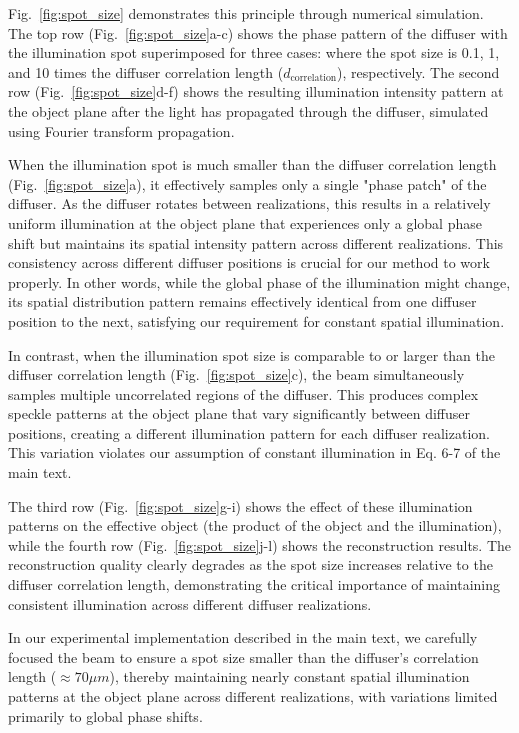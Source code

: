 \documentclass[pdflatex,sn-mathphys-num,Numbered]{sn-jnl}%
\theoremstyle{thmstyleone}%
\theoremstyle{thmstyletwo}%
\theoremstyle{thmstylethree}%
\begin{document}
Fig.~\ref{fig:spot_size} demonstrates this principle through numerical simulation. The top row (Fig.~\ref{fig:spot_size}a-c) shows the phase pattern of the diffuser with the illumination spot superimposed for three cases: where the spot size is 0.1, 1, and 10 times the diffuser correlation length ($d_{\text{correlation}}$), respectively. The second row (Fig.~\ref{fig:spot_size}d-f) shows the resulting illumination intensity pattern at the object plane after the light has propagated through the diffuser, simulated using Fourier transform propagation.

When the illumination spot is much smaller than the diffuser correlation length (Fig.~\ref{fig:spot_size}a), it effectively samples only a single "phase patch" of the diffuser. As the diffuser rotates between realizations, this results in a relatively uniform illumination at the object plane that experiences only a global phase shift but maintains its spatial intensity pattern across different realizations. This consistency across different diffuser positions is crucial for our method to work properly. In other words, while the global phase of the illumination might change, its spatial distribution pattern remains effectively identical from one diffuser position to the next, satisfying our requirement for constant spatial illumination.

In contrast, when the illumination spot size is comparable to or larger than the diffuser correlation length (Fig.~\ref{fig:spot_size}c), the beam simultaneously samples multiple uncorrelated regions of the diffuser. This produces complex speckle patterns at the object plane that vary significantly between diffuser positions, creating a different illumination pattern for each diffuser realization. This variation violates our assumption of constant illumination in Eq. 6-7 of the main text.

The third row (Fig.~\ref{fig:spot_size}g-i) shows the effect of these illumination patterns on the effective object (the product of the object and the illumination), while the fourth row (Fig.~\ref{fig:spot_size}j-l) shows the reconstruction results. The reconstruction quality clearly degrades as the spot size increases relative to the diffuser correlation length, demonstrating the critical importance of maintaining consistent illumination across different diffuser realizations.

In our experimental implementation described in the main text, we carefully focused the beam to ensure a spot size smaller than the diffuser's correlation length ($\approx 70 \mu m$), thereby maintaining nearly constant spatial illumination patterns at the object plane across different realizations, with variations limited primarily to global phase shifts.
\end{document}
